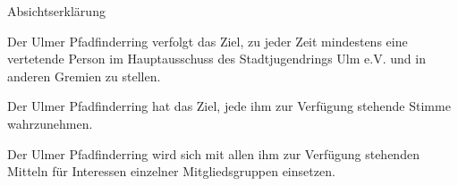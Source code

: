 \begin{legal}
    \item Absichtserklärung
        \begin{legal}
            \item Der Ulmer Pfadfinderring verfolgt das Ziel, zu jeder Zeit mindestens eine 
                  vertetende Person im Hauptausschuss des Stadtjugendrings Ulm e.V. 
                  und in anderen Gremien zu stellen.
            \item Der Ulmer Pfadfinderring hat das Ziel, jede ihm zur Verfügung stehende Stimme 
                  wahrzunehmen.
            \item Der Ulmer Pfadfinderring wird sich mit allen ihm zur Verfügung stehenden 
                  Mitteln für Interessen einzelner Mitgliedsgruppen einsetzen.
        \end{legal}
\end{legal}

